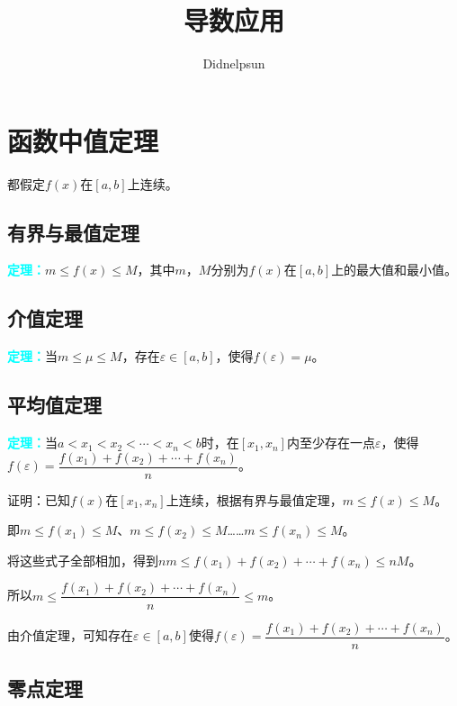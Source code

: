 \documentclass[UTF8, 12pt]{ctexart}
\author{Didnelpsun}
\title{导数应用}
\date{}
\begin{document}
\maketitle
\pagestyle{empty}
\thispagestyle{empty}
\tableofcontents
\thispagestyle{empty}
\newpage
\pagestyle{plain}
\setcounter{page}{1}

\section{函数中值定理}

都假定$f(x)$在$[a,b]$上连续。

\subsection{有界与最值定理}

\textcolor{aqua}{\textbf{定理：}}$m\leqslant f(x)\leqslant M$，其中$m$，$M$分别为$f(x)$在$[a,b]$上的最大值和最小值。

\subsection{介值定理}

\textcolor{aqua}{\textbf{定理：}}当$m\leqslant\mu\leqslant M$，存在$\varepsilon\in[a,b]$，使得$f(\varepsilon)=\mu$。

\subsection{平均值定理}

\textcolor{aqua}{\textbf{定理：}}当$a<x_1<x_2<\cdots<x_n<b$时，在$[x_1,x_n]$内至少存在一点$\varepsilon$，使得$f(\varepsilon)=\dfrac{f(x_1)+f(x_2)+\cdots+f(x_n)}{n}$。

证明：已知$f(x)$在$[x_1,x_n]$上连续，根据有界与最值定理，$m\leqslant f(x)\leqslant M$。

即$m\leqslant f(x_1)\leqslant M$、$m\leqslant f(x_2)\leqslant M$……$m\leqslant f(x_n)\leqslant M$。

将这些式子全部相加，得到$nm\leqslant f(x_1)+f(x_2)+\cdots+f(x_n)\leqslant nM$。

所以$m\leqslant\dfrac{f(x_1)+f(x_2)+\cdots+f(x_n)}{n}\leqslant m$。

由介值定理，可知存在$\varepsilon\in[a,b]$使得$f(\varepsilon)=\dfrac{f(x_1)+f(x_2)+\cdots+f(x_n)}{n}$。

\subsection{零点定理}
\end{document}
